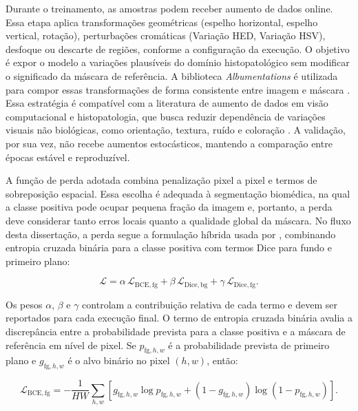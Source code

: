 Durante o treinamento, as amostras podem receber aumento de dados online. Essa
etapa aplica transformações geométricas (espelho horizontal, espelho vertical, rotação), perturbações cromáticas (Variação HED, Variação HSV), desfoque ou descarte de regiões, conforme a configuração da
execução. O objetivo é expor o modelo a variações plausíveis do domínio
histopatológico sem modificar o significado da máscara de referência. A
biblioteca \textit{Albumentations} é utilizada para compor essas transformações de forma
consistente entre imagem e máscara \cite{buslaev2020albumentations}. Essa
estratégia é compatível com a literatura de aumento de dados em visão
computacional e histopatologia, que busca reduzir dependência de variações
visuais não biológicas, como orientação, textura, ruído e coloração
\cite{dossantos2023augmentation,tellez2019augmentation,shorten2019survey,
zhong2020random}. A validação, por sua vez, não recebe aumentos estocásticos,
mantendo a comparação entre épocas estável e reproduzível.

A função de perda adotada combina penalização pixel a pixel e termos de
sobreposição espacial. Essa escolha é adequada à segmentação biomédica, na qual
a classe positiva pode ocupar pequena fração da imagem e, portanto, a perda deve
considerar tanto erros locais quanto a qualidade global da máscara. No fluxo
desta dissertação, a perda segue a formulação híbrida usada por
\textcite{khened2021generalized}, combinando entropia cruzada binária para a
classe positiva com termos Dice para fundo e primeiro plano:

\begin{equation}
    \mathcal{L} =
    \alpha\,\mathcal{L}_{\mathrm{BCE},\mathrm{fg}}
    + \beta\,\mathcal{L}_{\mathrm{Dice},\mathrm{bg}}
    + \gamma\,\mathcal{L}_{\mathrm{Dice},\mathrm{fg}}.
    \label{eq:perda_treinamento}
\end{equation}

Os pesos $\alpha$, $\beta$ e $\gamma$ controlam a contribuição relativa de cada
termo e devem ser reportados para cada execução final. O termo de entropia
cruzada binária avalia a discrepância entre a probabilidade prevista para a
classe positiva e a máscara de referência em nível de pixel. Se
$p_{\mathrm{fg},h,w}$ é a probabilidade prevista de primeiro plano e
$g_{\mathrm{fg},h,w}$ é o alvo binário no pixel $(h,w)$, então:

\begin{equation}
    \mathcal{L}_{\mathrm{BCE},\mathrm{fg}} =
    -\frac{1}{HW}
    \sum_{h,w}
    \left[
    g_{\mathrm{fg},h,w}\log p_{\mathrm{fg},h,w}
    +
    (1-g_{\mathrm{fg},h,w})\log(1-p_{\mathrm{fg},h,w})
    \right] .
    \label{eq:bce_fg}
\end{equation}

